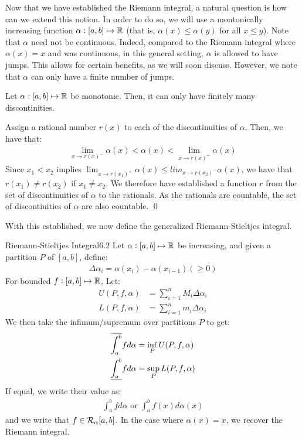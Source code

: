 \noindent Now that we have established the Riemann integral, a natural question is how can we extend this notion. In order to do so, we will use a montonically increasing function $\alpha: [a, b] \mapsto \mathbb{R}$ (that is, $\alpha(x) \leq \alpha(y)$ for all $x \leq y$). Note that $\alpha$ need not be continuous. Indeed, compared to the Riemann integral where $\alpha(x) = x$ and was continuous, in this general setting, $\alpha$ is allowed to have jumps. This allows for certain benefits, as we will soon discuss. However, we note that $\alpha$ can only have a finite number of jumps.

\begin{ntheorem}{ 4.30}{}
    Let $\alpha: [a, b] \mapsto \mathbb{R}$ be monotonic. Then, it can only have finitely many discontinities.
\end{ntheorem}
\begin{nproof}
    Assign a rational number $r(x)$ to each of the discontinuities of $\alpha$. Then, we have that:
    \begin{align*}
        \lim_{x \rightarrow r(x)^-} \alpha(x) < \alpha(x) < \lim_{x \rightarrow r(x)^+} \alpha(x)
    \end{align*}
    Since $x_1 < x_2$ implies $\lim_{x \rightarrow r(x_1)^+} \alpha(x) \leq lim_{x \rightarrow r(x_2)^-} \alpha(x)$, we have that $r(x_1) \neq r(x_2)$ if $x_1 \neq x_2$. We therefore have established a function $r$ from the set of discontinuities of $\alpha$ to the rationals. As the rationals are countable, the set of discontiuities of $\alpha$ are also countable. \qed
\end{nproof}

\noindent With this established, we now define the generalized Riemann-Stieltjes integral.

\begin{definition}{Riemann-Stieltjes Integral}{6.2}
    Let $\alpha: [a, b] \mapsto \mathbb{R}$ be increasing, and given a partition $P$ of $[a, b]$, define:
    \begin{align*}
        \Delta \alpha_i = \alpha(x_i) - \alpha(x_{i-1}) (\geq 0)
    \end{align*}
    For bounded $f: [a, b] \mapsto \mathbb{R}$, Let:
    \begin{align*}
        U(P, f, \alpha) &= \sum_{i=1}^n M_i \Delta \alpha_i
        \\ L(P, f, \alpha) &= \sum_{i=1}^n m_i \Delta \alpha_i
    \end{align*}
    We then take the infimum/supremum over partitions $P$ to get:
    \begin{align*}
        \overline{\int_{a}^{b}} f d\alpha &= \inf_P U(P, f, \alpha)
        \\ \underline{\int_{a}^{b}}f d\alpha &= \sup_P L(P, f, \alpha)
    \end{align*}
    If equal, we write their value as:
    \begin{align*}
        \int_a^b f d\alpha \text{ or } \int_a^b f(x)d\alpha(x)
    \end{align*}
    and we write that $f \in \mathcal{R}_\alpha[a, b]$. In the case where $\alpha(x) = x$, we recover the Riemann integral.
\end{definition}

